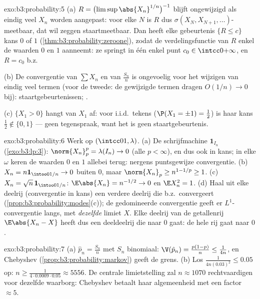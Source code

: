\begin{solution}{exo:b3:probability:5}
(a) $R = \bigl(\limsup\abs{X_n}^{1/n}\bigr)^{-1}$ blijft
ongewijzigd als eindig veel $X_n$ worden aangepast: voor elke $N$
is $R$ dus $\sigma(X_N, X_{N+1}, \dots)$-meetbaar, dat wil zeggen
staartmeetbaar. Dan heeft elke gebeurtenis $\{R \leq c\}$ kans
$0$ of $1$ (\cref{thm:b3:probability:zeroone}), zodat de
verdelingsfunctie van $R$ enkel de waarden $0$ en $1$ aanneemt:
ze springt in één enkel punt $c_0 \in \intcc0{+\infty}$, en $R =
c_0$ b.z.

(b) De convergentie van $\sum X_n$ en van $\frac{S_n}n$ is
ongevoelig voor het wijzigen van eindig veel termen (voor de
tweede: de gewijzigde termen dragen $O(1/n) \to 0$ bij):
staartgebeurtenissen; .

(c) $\{X_1 > 0\}$ hangt van $X_1$ af: voor i.i.d.\ tekens
($\P(X_1 = \pm1) = \frac12$) is haar kans $\frac12 \notin
\{0,1\}$ --- geen tegenspraak, want het is geen
staartgebeurtenis.
\end{solution}

\begin{solution}{exo:b3:probability:6}
Werk op $(\intcc01, \lambda)$.
(a) De schrijfmachine $\mathbf 1_{I_n}$ (\cref{exo:b3:lp:3}):
$\norm{X_n}_p^p = \lambda(I_n) \to 0$ (alle $p < \infty$), en dus
ook in kans; in elke $\omega$ keren de waarden $0$ en $1$ allebei
terug: nergens puntsgewijze convergentie.
(b) $X_n = n\mathbf 1_{\intoo0{1/n}} \to 0$ buiten $0$, maar
$\norm{X_n}_p \geq n^{1 - 1/p} \geq 1$.
(c) $X_n = \sqrt n\,\mathbf 1_{\intoo0{1/n}}$: $\E\abs{X_n} =
n^{-1/2} \to 0$ en $\E X_n^2 = 1$.
(d) Haal uit elke deelrij (convergentie in kans) een verdere
deelrij die b.z.\ convergeert
(\cref{prop:b3:probability:modes}(c)); de gedomineerde
convergentie geeft er $L^1$-convergentie langs, met
\emph{dezelfde} limiet $X$. Elke deelrij van de getallenrij
$\E\abs{X_n - X}$ heeft dus een deeldeelrij die naar $0$ gaat: de
hele rij gaat naar $0$.
\end{solution}

\begin{solution}{exo:b3:probability:7}
(a) $\hat p_n = \frac{S_n}n$ met $S_n$ binomiaal: $\V(\hat p_n) =
\frac{p(1-p)}n \leq \frac1{4n}$, en Chebyshev
(\cref{prop:b3:probability:markov}) geeft de grens.
(b) Los $\frac1{4n(0.03)^2} \leq 0.05$ op: $n \geq
\frac{1}{4\cdot0.0009\cdot0.05} \approx 5556$. De centrale
limietstelling zal $n \approx 1070$ rechtvaardigen voor dezelfde
waarborg: Chebyshev betaalt haar algemeenheid met een factor
$\approx 5$.
\end{solution}

